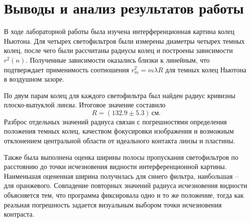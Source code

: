 \documentclass[12pt,a4paper]{article}
\newcommand{\cm}{\ensuremath{\,\text{см}}}
\begin{document}
\section{Выводы и анализ результатов работы}

В ходе лабораторной работы была изучена интерференционная картина колец Ньютона. Для четырех светофильтров были измерены диаметры четырех темных колец, после чего были рассчитаны радиусы колец и построены зависимости $r^2(n)$. Полученные зависимости оказались близки к линейным, что подтверждает применимость соотношения $r_m^2=m\lambda R$ для темных колец Ньютона в воздушном зазоре.

По двум парам колец для каждого светофильтра был найден радиус кривизны плоско-выпуклой линзы. Итоговое значение составило
\[
    R=(132.9\pm5.3)\cm.
\]
Разброс отдельных значений радиуса связан с погрешностями определения положения темных колец, качеством фокусировки изображения и возможным отклонением центральной области от идеального контакта линзы и пластины.

Также была выполнена оценка ширины полосы пропускания светофильтров по расстоянию до точки исчезновения видности интерференционной картины. Наименьшая оцененная ширина получилась для синего фильтра, наибольшая -- для оранжевого. Совпадение повторных значений радиуса исчезновения видности объясняется тем, что программа фиксировала одно и то же положение, тогда как реальная погрешность задается визуальным выбором точки исчезновения контраста.
\end{document}
